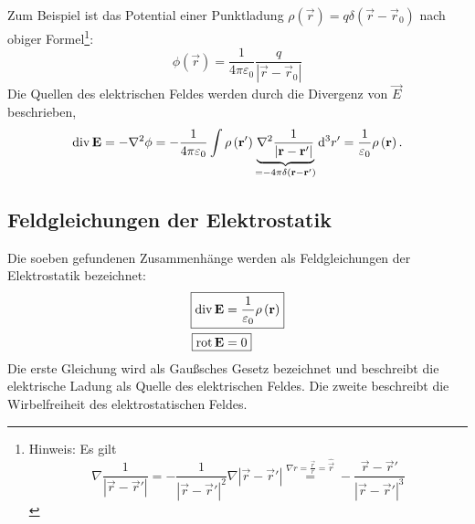 Zum Beispiel ist das Potential einer Punktladung $\rho \left(\vec {r}\right)=q\delta \left(\vec {r}-\vec {r}_{0}\right)$ nach obiger Formel\footnote{Hinweis: Es gilt
	\begin{equation*}
		\nabla \frac{1}{\left| \vec {r}-\vec {r}\mathrm{'}\right| }=-\frac{1}{\left| \vec {r}-\vec {r}\mathrm{'}\right| ^{2}}\nabla \left| \vec {r}-\vec {r}\mathrm{'}\right| \overset{\nabla r=\frac{\vec {r}}{r}=\hat{\vec {r}}}{=}-\frac{\vec {r}-\vec {r}\mathrm{'}}{\left| \vec {r}-\vec {r}\mathrm{'}\right| ^{3}}
	\end{equation*}
}:
\begin{equation*}
	\phi \left(\vec {r}\right)=\frac{1}{4\pi \varepsilon _{0}}\frac{q}{\left| \vec {r}-\vec {r}_{0}\right| }
\end{equation*}
Die Quellen des elektrischen Feldes werden durch die Divergenz von $\vec E$ beschrieben,
\begin{equation*}
	\operatorname{div} \mathbf{E}=-\nabla ^{2}\phi =-\frac{1}{4\pi \varepsilon _{0}}\int \rho \left(\mathbf{r}\mathrm{'}\right)\underset{=-4\pi \delta \left(\mathbf{r}-\mathbf{r}\mathrm{'}\right)}{\underbrace{\nabla ^{2}\frac{1}{\left| \mathbf{r}-\mathbf{r}\mathrm{'}\right| }}}\mathop{}\!\mathrm{d} ^{3}r\mathrm{'}=\frac{1}{\varepsilon _{0}}\rho \left(\mathbf{r}\right).
\end{equation*}


\subsection{Feldgleichungen der Elektrostatik}

Die soeben gefundenen Zusammenhänge werden als Feldgleichungen der Elektrostatik bezeichnet:
\begin{align}
	\label{3.4}
	\Aboxed{\divg \vec {E} & =\frac{1}{\varepsilon _{0}}\rho \left(\vec {r}\right)} \\
	\label{3.5}
	\Aboxed{\rot \vec {E}  & =0}
\end{align}
Die erste Gleichung wird als Gaußsches Gesetz bezeichnet und beschreibt die elektrische Ladung als Quelle des elektrischen Feldes. Die zweite beschreibt die Wirbelfreiheit des elektrostatischen Feldes.

